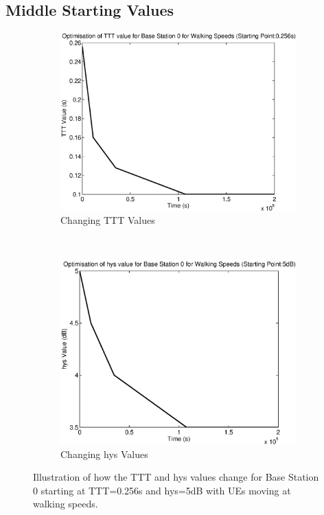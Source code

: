 \subsection{Middle Starting Values}\label{ap:walk_mid}
\begin{figure}[H]
        \centering
        \begin{subfigure}[b]{0.49\textwidth}
                \includegraphics[width=\textwidth]{figures/graphs/walkmid/TTT0.eps}
                \caption{Changing TTT Values}
        \end{subfigure}%
        ~ %
        \begin{subfigure}[b]{0.49\textwidth}
                \includegraphics[width=\textwidth]{figures/graphs/walkmid/hys0.eps}
                \caption{Changing hys Values}
        \end{subfigure}
        \caption{Illustration of how the TTT and hys values change for Base Station 0 starting at TTT=0.256s and hys=5dB with UEs moving at walking speeds.}
\end{figure}
